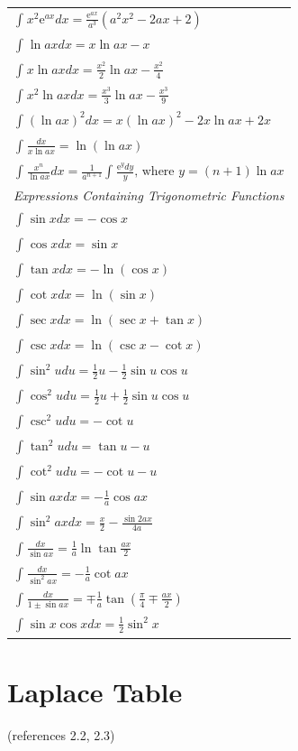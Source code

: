 \documentclass[
]{book}
\begin{document}
\begin{longtable}[]{@{}l@{}}
\( \int_{}{} x^2 \mathrm{e}^{ax} dx = \frac{\mathrm{e}^{ax}}{a^3} \left(a^2 x^2 - 2ax + 2 \right) \)\tabularnewline
\( \int_{}{} \ln{ax} dx = x \ln{ax} - x \)\tabularnewline
\( \int_{}{} x \ln{ax} dx = \frac{x^2}{2} \ln{ax} - \frac{x^2}{4} \)\tabularnewline
\( \int_{}{} x^2 \ln{ax} dx = \frac{x^3}{3} \ln{ax} - \frac{x^3}{9} \)\tabularnewline
\( \int_{}{} \left( \ln{ax} \right)^2 dx = x \left( \ln{ax} \right)^2 - 2x \ln{ax} + 2x \)\tabularnewline
\( \int_{}{} \frac{dx}{x \ln{ax}} = \ln{\left( \ln{ax} \right)} \)\tabularnewline
\( \int_{}{} \frac{x^n}{\ln{ax}} dx = \frac{1}{a^{n+1}} \int_{}{} \frac{\mathrm{e}^{y} dy}{y} \text{, where } y = \left(n + 1\right) \ln{ax} \)\tabularnewline
\emph{Expressions Containing Trigonometric Functions}\tabularnewline
\( \int_{}{} \sin{x} dx = -\cos{x} \)\tabularnewline
\( \int_{}{} \cos{x} dx = \sin{x} \)\tabularnewline
\( \int_{}{} \tan{x} dx = -\ln{ \left( \cos{x} \right)} \)\tabularnewline
\( \int_{}{} \cot{x} dx = \ln{\left( \sin{x} \right)} \)\tabularnewline
\( \int_{}{} \sec{x} dx = \ln{ \left( \sec{x} + \tan{x} \right)} \)\tabularnewline
\( \int_{}{} \csc{x} dx = \ln{ \left( \csc{x} - \cot{x} \right)} \)\tabularnewline
\( \int_{}{} \sin^2{u} du = \frac{1}{2} u - \frac{1}{2} \sin{u} \cos{u} \)\tabularnewline
\( \int_{}{} \cos^2{u} du = \frac{1}{2} u + \frac{1}{2} \sin{u} \cos{u} \)\tabularnewline
\( \int_{}{} \csc^2{u} du = -\cot{u} \)\tabularnewline
\( \int_{}{} \tan^2{u} du = \tan{u} - u \)\tabularnewline
\( \int_{}{} \cot^2{u} du = -\cot{u} - u \)\tabularnewline
\( \int_{}{} \sin{ax} dx = -\frac{1}{a} \cos{ax} \)\tabularnewline
\( \int_{}{} \sin^2{ax} dx = \frac{x}{2}-\frac{\sin{2ax}}{4a}  \)\tabularnewline
\( \int_{}{} \frac{dx}{\sin{ax}} = \frac{1}{a} \ln{ \tan{\frac{ax}{2}}} \)\tabularnewline
\( \int_{}{} \frac{dx}{\sin^2{ax}} = -\frac{1}{a} \cot{ax} \)\tabularnewline
\( \int_{}{} \frac{dx}{1 \pm \sin{ax}} = \mp \frac{1}{a} \tan{\left( \frac{\pi}{4} \mp \frac{ax}{2} \right) } \)\tabularnewline
\( \int_{}{} \sin{x} \cos{x} dx = \frac{1}{2} \sin^2{x} \)\tabularnewline
\bottomrule
\end{longtable}

\hypertarget{laplace-table}{%
\section{Laplace Table}\label{laplace-table}}

(references 2.2, 2.3)
\end{document}
